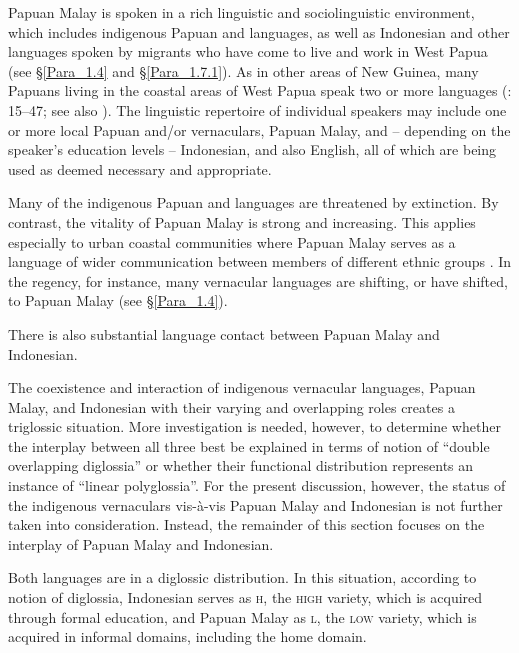 Papuan Malay is spoken in a rich linguistic and sociolinguistic environment, which includes indigenous Papuan and  languages, as well as Indonesian and other languages spoken by migrants who have come to live and work in West Papua (see §\ref{Para_1.4} and §\ref{Para_1.7.1}). As in other areas of New Guinea, many Papuans living in the coastal areas of West Papua speak two or more languages (\citealt{Foley.1986}: 15–47; see also \citealt{Muhlhausler.1996}). The linguistic repertoire of individual speakers may include one or more local Papuan and/or  vernaculars, Papuan Malay, and – depending on the speaker’s education levels – Indonesian, and also English, all of which are being used as deemed necessary and appropriate.



Many of the indigenous Papuan and  languages are threatened by extinction. By contrast, the vitality of Papuan Malay is strong and increasing. This applies especially to urban coastal communities where Papuan Malay serves as a language of wider communication between members of different ethnic groups \citep[10–18]{Scott.2008}. In the  regency, for instance, many vernacular languages are shifting, or have shifted, to Papuan Malay (see §\ref{Para_1.4}).



There is also substantial language contact between Papuan Malay and Indonesian.



The coexistence and interaction of indigenous vernacular languages, Papuan Malay, and Indonesian with their varying and overlapping roles creates a triglossic situation. More investigation is needed, however, to determine whether the interplay between all three best be explained in terms of  notion of ``double overlapping diglossia'' or whether their functional distribution represents an instance of ``linear polyglossia''. For the present discussion, however, the status of the indigenous vernaculars vis-à-vis Papuan Malay and Indonesian is not further taken into consideration. Instead, the remainder of this section focuses on the interplay of Papuan Malay and Indonesian.



Both languages are in a diglossic distribution. In this situation, according to  notion of diglossia, Indonesian serves as \textsc{h}, the \textsc{high} variety, which is acquired through formal education, and Papuan Malay as \textsc{l}, the \textsc{low} variety, which is acquired in informal domains, including the home domain.



